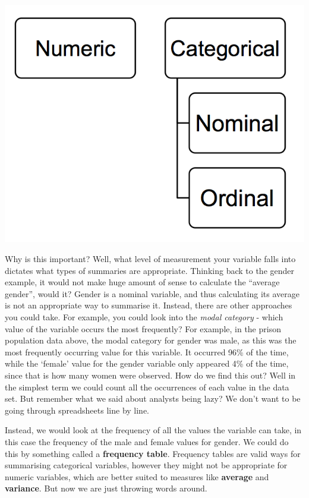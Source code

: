 \documentclass[
]{book}
\begin{document}
\includegraphics{imgs/lvl_msr_diagr.png}

Why is this important? Well, what level of measurement your variable falls into dictates what types of summaries are appropriate. Thinking back to the gender example, it would not make huge amount of sense to calculate the ``average gender'', would it? Gender is a nominal variable, and thus calculating its average is not an appropriate way to summarise it. Instead, there are other approaches you could take. For example, you could look into the \emph{modal category} - which value of the variable occurs the most frequently? For example, in the prison population data above, the modal category for gender was male, as this was the most frequently occurring value for this variable. It occurred 96\% of the time, while the `female' value for the gender variable only appeared 4\% of the time, since that is how many women were observed. How do we find this out? Well in the simplest term we could count all the occurrences of each value in the data set. But remember what we said about analysts being lazy? We don't want to be going through spreadsheets line by line.

Instead, we would look at the frequency of all the values the variable can take, in this case the frequency of the male and female values for gender. We could do this by something called a \textbf{frequency table}. Frequency tables are valid ways for summarising categorical variables, however they might not be appropriate for numeric variables, which are better suited to measures like \textbf{average} and \textbf{variance}. But now we are just throwing words around.
\end{document}
